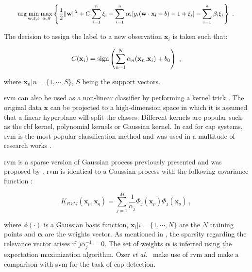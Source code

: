 \begin{equation}
\small
\arg\min_{\mathbf{w},\mathbf{\xi}, b } \max_{\boldsymbol{\alpha},\boldsymbol{\beta} } \left\{ \frac{1}{2}\|\mathbf{w}\|^2+C \sum_{i=1}^n \xi_i - \sum_{i=1}^{n}{\alpha_i[y_i(\mathbf{w}\cdot \mathbf{x_i} - b) -1 + \xi_i]} - \sum_{i=1}^{n} \beta_i \xi_i \right\} \ .
\end{equation}

The decision to assign the label to a new observation $\mathbf{x}_i$ is taken such that:

\begin{equation}
	C(\mathbf{x}_i) = \operatorname*{sign} \left( \sum_{n=1}^{N} \alpha_n (\mathbf{x}_n . \mathbf{x}_i) + b_0 \right) \ ,
	\label{eq:svmdec} 
\end{equation}

\noindent where $\mathbf{x}_n|n=\{1,\cdots,S\}$, $S$ being the support vectors.

\ac{svm} can also be used as a non-linear classifier by performing a kernel trick \cite{Boser1992}.
The original data $\mathbf{x}$ can be projected to a high-dimension space in which it is assumed that a linear hyperplane will split the classes.
Different kernels are popular such as the \ac{rbf} kernel, polynomial kernels or Gaussian kernel.
In \ac{cad} for \ac{cap} systems, \ac{svm} is the most popular classification method and was used in a multitude of research works \cite{Artan2009,Artan2010,Chan2003,Kelm2007,Litjens2011,Litjens2012,Liu2013,Lopes2011,Niaf2011,Niaf2012,Ozer2009,Ozer2010,Parfait2012,Peng2013,Sung2011,Tiwari2012,Vos2008,Vos2008a,Vos2010,Vos2012}.

\Acf{rvm} is a sparse version of Gaussian process previously presented and was proposed by \cite{Tipping2001}.
\ac{rvm} is identical to a Gaussian process with the following covariance function \cite{Quinonero-Candela2002}:

\begin{equation}
	K_{RVM}(\mathbf{x}_p,\mathbf{x}_q) = \sum_{j=1}^{M} \frac{1}{\alpha_j} \Phi_j ( \mathbf{x}_p ) \Phi_j ( \mathbf{x}_q ) \ ,
 	\label{eq:rvm}
\end{equation}

\noindent where $\phi(\cdot)$ is a Gaussian basis function, $\mathbf{x}_i|i=\{1,\cdots,N\}$ are the $N$ training points and $\boldsymbol{\alpha}$ are the weights vector.
As mentioned in \cite{Quinonero-Candela2002}, the sparsity regarding the relevance vector arises if $j \alpha_j^{-1} = 0$.
The set of weights $\boldsymbol{\alpha}$ is inferred using the expectation maximization algorithm.
Ozer \textit{et al.}~\cite{Ozer2009,Ozer2010} make use of \ac{rvm} and make a comparison with \ac{svm} for the task of \ac{cap} detection.

